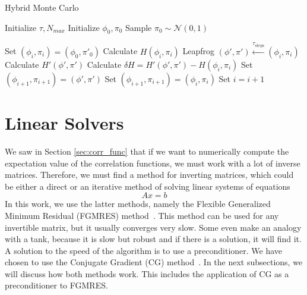 \begin{algorithm}
    \caption{Hybrid Monte Carlo}
    \begin{algorithmic}[1]
        \State Initialize  $\tau, N_{max}$
        \State Initialize $\phi_0, \pi_0$
        \State Sample $\pi_0 \sim \mathcal{N}(0,1)$

        \State Set $(\phi_{i}, \pi_{i}) = (\phi_0, \pi'_0)$ 
          
            \State Calculate $H(\phi_{i}, \pi_{i})$
            \State Leapfrog $(\phi', \pi') \xleftarrow{\tau_\text{steps}} (\phi_{i}, \pi_{i})$ 
            \State Calculate $H'(\phi',\pi')$
            \State Calculate $\delta H = H'(\phi',\pi')-H(\phi_{i},\pi_{i})$
             
                \State Set $(\phi_{i+1}, \pi_{i+1}) = (\phi', \pi')$
                \Else
                \State Set $(\phi_{i+1}, \pi_{i+1}) = (\phi_{i}, \pi_{i})$
            \EndIf
        \State Set $i = i + 1$
        \EndWhile
    \end{algorithmic}
    \label{alg:hmc}
    \end{algorithm}

\section{Linear Solvers}

We saw in Section \ref{sec:corr_func} that if we want to numerically compute the expectation value of the correlation functions, we must work with a lot of inverse matrices. Therefore, we must find a method for inverting matrices, which could be either a direct or an iterative method of solving linear systems of equations
\begin{equation}
    Ax = b
    \label{eq:lineq}
\end{equation}
In this work, we use the latter methods, namely the Flexible Generalized Minimum Residual (FGMRES) method~\cite{fgmresart}. This method can be used for any invertible matrix, but it usually converges very slow. Some even make an analogy with a tank, because it is slow but robust and if there is a solution, it will find it. A solution to the speed of the algorithm is to use a preconditioner. We have chosen to use the Conjugate Gradient (CG) method~\cite{cgbook}. In the next subsections, we will discuss how both methods work. This includes the application of CG as a preconditioner to FGMRES.

